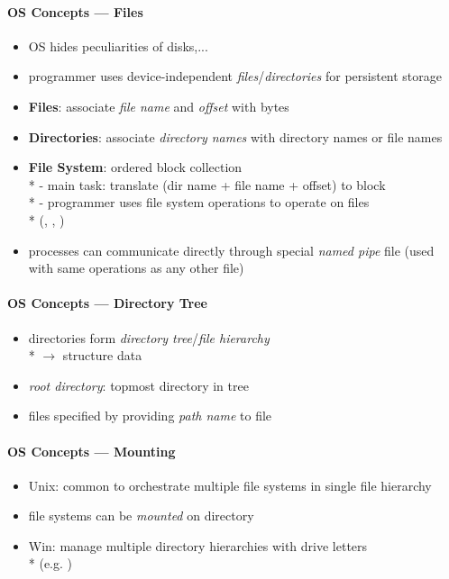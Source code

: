 \paragraph{OS Concepts --- Files}
\begin{itemize}
	\item OS hides peculiarities of disks,...
	\item programmer uses device-independent \emph{files}/\emph{directories} for persistent storage
	\item \textbf{Files}: associate \emph{file name} and \emph{offset} with bytes
	\item \textbf{Directories}: associate \emph{directory names} with directory names or file names
	\item \textbf{File System}: ordered block collection \\*
		- main task: translate (dir name + file name + offset) to block \\*
		- programmer uses file system operations to operate on files \\* \phantom{-} (, , )
	\item processes can communicate directly through special \emph{named pipe} file (used with same operations as any other file)
\end{itemize}

\paragraph{OS Concepts --- Directory Tree}
\begin{itemize}
	\item directories form \emph{directory tree}/\emph{file hierarchy} \\*
		\( \to \) structure data
	\item \emph{root directory}: topmost directory in tree
	\item files specified by providing \emph{path name} to file
\end{itemize}

\paragraph{OS Concepts --- Mounting}
\begin{itemize}
	\item Unix: common to orchestrate multiple file systems in single file hierarchy
	\item file systems can be \emph{mounted} on directory
	\item Win: manage multiple directory hierarchies with drive letters
		\\*
		(e.g. )
\end{itemize}


